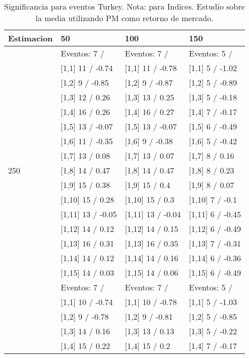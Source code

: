 \begin{table}

\caption{Significancia para eventos Turkey. Nota: para Indices. Estudio sobre la media utilizando PM como retorno de mercado.}
\centering
\begin{tabular}[t]{llll}
\toprule
Estimacion & 50 & 100 & 150\\
\midrule
 & Eventos:  7 / & Eventos:  7 / & Eventos:  5 /\\
 & {}[1,1] 11  / -0.74 & {}[1,1] 11  / -0.78 & {}[1,1] 5  / -1.02\\
 & {}[1,2] 9  / -0.85 & {}[1,2] 9  / -0.87 & {}[1,2] 5  / -0.89\\
 & {}[1,3] 12  / 0.26 & {}[1,3] 13  / 0.25 & {}[1,3] 5  / -0.18\\
 & {}[1,4] 16  / 0.26 & {}[1,4] 16  / 0.27 & {}[1,4] 7  / -0.17\\
\addlinespace
 & {}[1,5] 13  / -0.07 & {}[1,5] 13  / -0.07 & {}[1,5] 6  / -0.49\\
 & {}[1,6] 11  / -0.35 & {}[1,6] 9  / -0.38 & {}[1,6] 5  / -0.42\\
 & {}[1,7] 13  / 0.08 & {}[1,7] 13  / 0.07 & {}[1,7] 8  / 0.16\\
250 & {}[1,8] 14  / 0.47 & {}[1,8] 14  / 0.47 & {}[1,8] 8  / 0.23\\
 & {}[1,9] 15  / 0.38 & {}[1,9] 15  / 0.4 & {}[1,9] 8  / 0.07\\
\addlinespace
 & {}[1,10] 15  / 0.28 & {}[1,10] 15  / 0.3 & {}[1,10] 7  / -0.1\\
 & {}[1,11] 13  / -0.05 & {}[1,11] 13  / -0.04 & {}[1,11] 6  / -0.45\\
 & {}[1,12] 14  / 0.12 & {}[1,12] 14  / 0.15 & {}[1,12] 6  / -0.49\\
 & {}[1,13] 16  / 0.31 & {}[1,13] 16  / 0.35 & {}[1,13] 7  / -0.31\\
 & {}[1,14] 14  / 0.12 & {}[1,14] 14  / 0.16 & {}[1,14] 6  / -0.36\\
\addlinespace
 & {}[1,15] 14  / 0.03 & {}[1,15] 14  / 0.06 & {}[1,15] 6  / -0.49\\
 & Eventos:  7 / & Eventos:  7 / & Eventos:  5 /\\
 & {}[1,1] 10  / -0.74 & {}[1,1] 10  / -0.78 & {}[1,1] 5  / -1.03\\
 & {}[1,2] 9  / -0.78 & {}[1,2] 9  / -0.81 & {}[1,2] 5  / -0.85\\
 & {}[1,3] 14  / 0.16 & {}[1,3] 13  / 0.13 & {}[1,3] 5  / -0.22\\
\addlinespace
 & {}[1,4] 15  / 0.22 & {}[1,4] 15  / 0.2 & {}[1,4] 7  / -0.17\\

\end{tabular}
\end{table}
